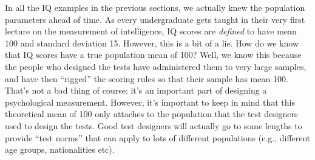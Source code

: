 \documentclass[spanish,]{book}
\begin{document}
In all the IQ examples in the previous sections, we actually knew the
population parameters ahead of time. As every undergraduate gets taught
in their very first lecture on the measurement of intelligence, IQ
scores are \emph{defined} to have mean 100 and standard deviation 15.
However, this is a bit of a lie. How do we know that IQ scores have a
true population mean of 100? Well, we know this because the people who
designed the tests have administered them to very large samples, and
have then ``rigged'' the scoring rules so that their sample has mean
100. That's not a bad thing of course: it's an important part of
designing a psychological measurement. However, it's important to keep
in mind that this theoretical mean of 100 only attaches to the
population that the test designers used to design the tests. Good test
designers will actually go to some lengths to provide ``test norms''
that can apply to lots of different populations (e.g., different age
groups, nationalities etc).
\end{document}
